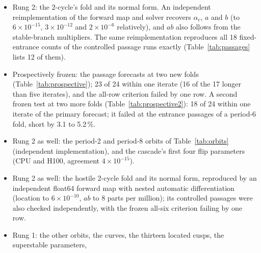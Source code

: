\documentclass[11pt,letterpaper]{article}
\begin{document}
\begin{itemize}
  centers, and it is locally attracting. The construction is that of the period-8 proof, with point enclosures at
  2048 bits and derivative enclosures at 1024 bits, in 42 pieces that cover every phase and all 896 directions. The
  bounds on the first, second and fourth powers of the enclosed monodromy failed the sufficient condition for
  attraction and stay in the record; the eighth power passes, with an induced infinity-norm bound of at most $0.447$
  (for a 3-cycle, a bound on the derivative over 24 steps). An independent exact-rational audit rechecked the scalar
  and separation witnesses and every saved row norm (3\,211\,264 entries); it did not recompute the enclosures of the
  model or the dense products. The proof does not certify the orbit's token loop, which starts reach it, or the later
  orbits of the cascade: a certificate of the 6-cycle on the same cut was begun and not completed. The record is
  .
\item Rung 2: the 2-cycle's fold and its normal form. An independent reimplementation of the forward map and solver
  recovers $\alpha_c$, $a$ and $b$ (to $6\times10^{-15}$, $3\times10^{-12}$ and $2\times10^{-6}$ relatively), and $ab$
  also follows from the stable-branch multipliers. The same reimplementation reproduces all 18 fixed-entrance counts
  of the controlled passage runs exactly (Table~\ref{tab:passages} lists 12 of them).
\item Prospectively frozen: the passage forecasts at two new folds (Table~\ref{tab:prospective}); 23 of 24 within one
  iterate (16 of the 17 longer than five iterates), and the all-row criterion failed by one row. A second frozen test
  at two more folds (Table~\ref{tab:prospective2}): 18 of 24 within one iterate of the primary forecast; it failed at
  the entrance passages of a period-6 fold, short by 3.1 to 5.2\,\%.
\item Rung 2 as well: the period-2 and period-8 orbits of Table~\ref{tab:orbits} (independent implementation), and
  the cascade's first four flip parameters (CPU and H100, agreement $4\times10^{-15}$).
\item Rung 2 as well: the hostile 2-cycle fold and its normal form, reproduced by an independent float64 forward map
  with nested automatic differentiation (location to $6\times10^{-10}$, $ab$ to 8 parts per million); its controlled
  passages were also checked independently, with the frozen all-six criterion failing by one row.
\item Rung 1: the other orbits, the curves, the thirteen located cusps, the superstable parameters,

\end{itemize}
\end{document}

